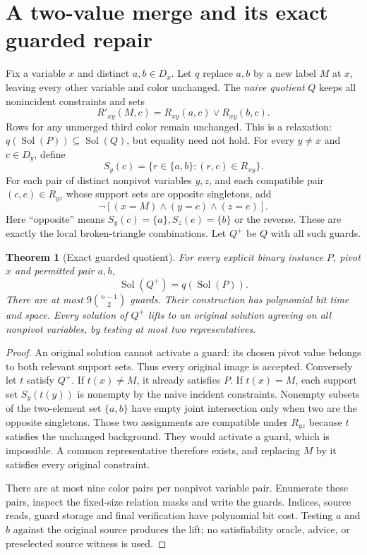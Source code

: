 \documentclass[11pt]{article}
\newtheorem{theorem}{Theorem}
\newcommand{\Sol}{\operatorname{Sol}}
\begin{document}
\section{A two-value merge and its exact guarded repair}
Fix a variable $x$ and distinct $a,b\in D_x$. Let $q$ replace $a,b$ by a new
label $M$ at $x$, leaving every other variable and color unchanged. The
\emph{naive quotient} $Q$ keeps all nonincident constraints and sets
\[
 R'_{xy}(M,c)=R_{xy}(a,c)\lor R_{xy}(b,c).
\]
Rows for any unmerged third color remain unchanged. This is a relaxation:
$q(\Sol(P))\subseteq\Sol(Q)$, but equality need not hold.
For every $y\ne x$ and $c\in D_y$, define
\[
 S_y(c)=\{r\in\{a,b\}:(r,c)\in R_{xy}\}.
\]
For each pair of distinct nonpivot variables $y,z$, and each compatible
pair $(c,e)\in R_{yz}$ whose support sets are opposite singletons, add
\begin{equation}\label{eq:guard}
             \neg[(x=M)\land(y=c)\land(z=e)].
\end{equation}
Here ``opposite'' means $S_y(c)=\{a\},S_z(e)=\{b\}$ or the reverse.
These are exactly the local broken-triangle combinations. Let $Q^+$ be $Q$
with all such guards.

\begin{theorem}[Exact guarded quotient]\label{thm:guard}
For every explicit binary instance $P$, pivot $x$ and permitted pair $a,b$,
\[
                       \Sol(Q^+)=q(\Sol(P)).
\]
There are at most $9\binom{n-1}{2}$ guards. Their construction has polynomial
bit time and space. Every solution of $Q^+$ lifts to an original solution
agreeing on all nonpivot variables, by testing at most two representatives.
\end{theorem}
\begin{proof}
An original solution cannot activate a guard: its chosen pivot value belongs
to both relevant support sets. Thus every original image is accepted.
Conversely let $t$ satisfy $Q^+$. If $t(x)\ne M$, it already satisfies $P$.
If $t(x)=M$, each support set $S_y(t(y))$ is nonempty by the naive incident
constraints. Nonempty subsets of the two-element set $\{a,b\}$ have empty
joint intersection only when two are the opposite singletons. Those two
assignments are compatible under $R_{yz}$ because $t$ satisfies the unchanged
background. They would activate a guard, which is impossible. A common
representative therefore exists, and replacing $M$ by it satisfies every
original constraint.

There are at most nine color pairs per nonpivot variable pair. Enumerate
these pairs, inspect the fixed-size relation masks and write the guards.
Indices, source reads, guard storage and final verification have polynomial
bit cost. Testing $a$ and $b$ against the original source produces the lift;
no satisfiability oracle, advice, or preselected source witness is used.
\end{proof}
\end{document}
